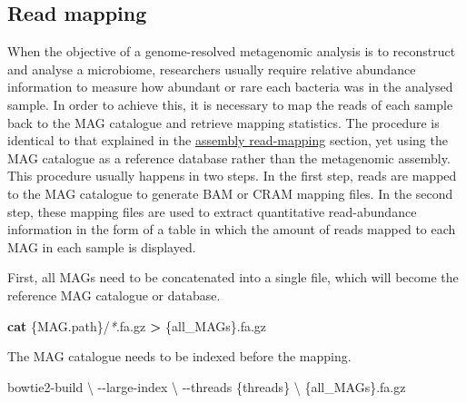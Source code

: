 \documentclass[
]{book}
\newenvironment{Shaded}{\begin{snugshade}}{\end{snugshade}}
\newcommand{\AttributeTok}[1]{\textcolor[rgb]{0.13,0.29,0.53}{#1}}
\newcommand{\DataTypeTok}[1]{\textcolor[rgb]{0.13,0.29,0.53}{#1}}
\newcommand{\ExtensionTok}[1]{#1}
\newcommand{\FunctionTok}[1]{\textcolor[rgb]{0.13,0.29,0.53}{\textbf{#1}}}
\newcommand{\NormalTok}[1]{#1}
\newcommand{\OperatorTok}[1]{\textcolor[rgb]{0.81,0.36,0.00}{\textbf{#1}}}
\newcommand{\PreprocessorTok}[1]{\textcolor[rgb]{0.56,0.35,0.01}{\textit{#1}}}
\begin{document}
\hypertarget{genome-resolved-mapping}{%
\subsection*{Read mapping}\label{genome-resolved-mapping}}

When the objective of a genome-resolved metagenomic analysis is to reconstruct and analyse a microbiome, researchers usually require relative abundance information to measure how abundant or rare each bacteria was in the analysed sample. In order to achieve this, it is necessary to map the reads of each sample back to the MAG catalogue and retrieve mapping statistics. The procedure is identical to that explained in the \protect\hyperlink{assembly-read-mapping}{assembly read-mapping} section, yet using the MAG catalogue as a reference database rather than the metagenomic assembly. This procedure usually happens in two steps. In the first step, reads are mapped to the MAG catalogue to generate BAM or CRAM mapping files. In the second step, these mapping files are used to extract quantitative read-abundance information in the form of a table in which the amount of reads mapped to each MAG in each sample is displayed.

First, all MAGs need to be concatenated into a single file, which will become the reference MAG catalogue or database.
\small

\begin{Shaded}
\begin{Highlighting}[]
\FunctionTok{cat}\NormalTok{ \{MAG.path\}/}\PreprocessorTok{*}\NormalTok{.fa.gz }\OperatorTok{\textgreater{}}\NormalTok{ \{all\_MAGs\}.fa.gz}
\end{Highlighting}
\end{Shaded}

\normalsize

The MAG catalogue needs to be indexed before the mapping.
\small

\begin{Shaded}
\begin{Highlighting}[]
\ExtensionTok{bowtie2{-}build} \DataTypeTok{\textbackslash{}}
      \AttributeTok{{-}{-}large{-}index} \DataTypeTok{\textbackslash{}}
      \AttributeTok{{-}{-}threads}\NormalTok{ \{threads\} }\DataTypeTok{\textbackslash{}}
\NormalTok{       \{all\_MAGs\}.fa.gz}
\end{Highlighting}
\end{Shaded}

\normalsize
\end{document}
